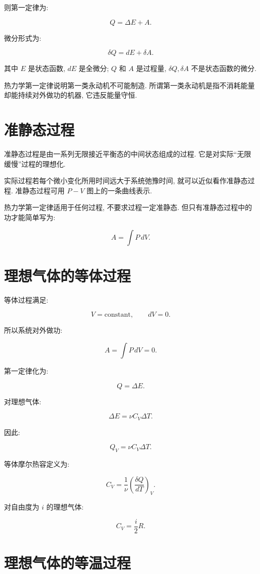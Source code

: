 \documentclass[
  a4paper,
]{ctexrep}
\begin{document}
则第一定律为:

\[
Q=\Delta E + A.
\]

微分形式为:

\[
\delta Q=dE+\delta A.
\]

其中 \(E\) 是状态函数, \(dE\) 是全微分; \(Q\) 和 \(A\) 是过程量,
\(\delta Q,\delta A\) 不是状态函数的微分.

热力学第一定律说明第一类永动机不可能制造.
所谓第一类永动机是指不消耗能量却能持续对外做功的机器, 它违反能量守恒.

\section{准静态过程}\label{ux51c6ux9759ux6001ux8fc7ux7a0b}

准静态过程是由一系列无限接近平衡态的中间状态组成的过程.
它是对实际``无限缓慢''过程的理想化.

实际过程若每个微小变化所用时间远大于系统弛豫时间,
就可以近似看作准静态过程. 准静态过程可用 \(P-V\) 图上的一条曲线表示.

热力学第一定律适用于任何过程, 不要求过程一定准静态.
但只有准静态过程中的功才能简单写为:

\[
A=\int P\,dV.
\]

\section{理想气体的等体过程}\label{ux7406ux60f3ux6c14ux4f53ux7684ux7b49ux4f53ux8fc7ux7a0b}

等体过程满足:

\[
V=\mathrm{constant},\qquad dV=0.
\]

所以系统对外做功:

\[
A=\int P\,dV=0.
\]

第一定律化为:

\[
Q=\Delta E.
\]

对理想气体:

\[
\Delta E=\nu C_V\Delta T.
\]

因此:

\[
Q_V=\nu C_V\Delta T.
\]

等体摩尔热容定义为:

\[
C_V=\frac{1}{\nu}\left(\frac{\delta Q}{dT}\right)_V.
\]

对自由度为 \(i\) 的理想气体:

\[
C_V=\frac{i}{2}R.
\]

\section{理想气体的等温过程}\label{ux7406ux60f3ux6c14ux4f53ux7684ux7b49ux6e29ux8fc7ux7a0b}
\end{document}
